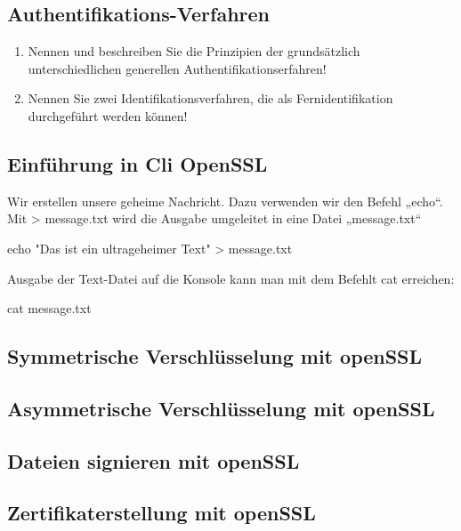 \documentclass[a4paper]{article}
\begin{document}
\subsection{Authentifikations-Verfahren}

\begin{enumerate}
    \item Nennen und beschreiben Sie die Prinzipien der grundsätzlich unterschiedlichen generellen Authentifikationserfahren!
    

    \item Nennen Sie zwei Identifikationsverfahren, die als Fernidentifikation durchgeführt werden können!
    

\end{enumerate}

\subsection{Einführung in Cli OpenSSL}

Wir erstellen unsere geheime Nachricht. Dazu verwenden wir den Befehl „echo“. Mit > message.txt wird die Ausgabe umgeleitet in eine Datei „message.txt“

echo "Das ist ein ultrageheimer Text" > message.txt

Ausgabe der Text-Datei auf die Konsole kann man mit dem Befehlt cat erreichen:

cat message.txt

\subsection{Symmetrische Verschlüsselung mit openSSL}

\subsection{Asymmetrische Verschlüsselung mit openSSL}

\subsection{Dateien signieren mit openSSL}

\subsection{Zertifikaterstellung mit openSSL}
\end{document}
